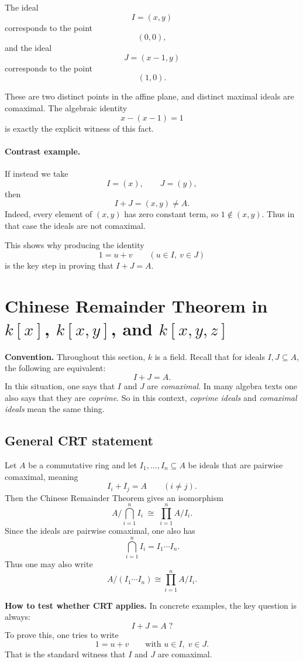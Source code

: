 \documentclass[12pt,a4paper]{article}
\theoremstyle{notespace}
\begin{document}
The ideal
\[
I=(x,y)
\]
corresponds to the point
\[
(0,0),
\]
and the ideal
\[
J=(x-1,y)
\]
corresponds to the point
\[
(1,0).
\]

These are two distinct points in the affine plane, and distinct maximal ideals are comaximal. The algebraic identity
\[
x-(x-1)=1
\]
is exactly the explicit witness of this fact.

\paragraph{Contrast example.}

If instead we take
\[
I=(x),\qquad J=(y),
\]
then
\[
I+J=(x,y)\neq A.
\]
Indeed, every element of \((x,y)\) has zero constant term, so \(1\notin (x,y)\). Thus in that case the ideals are not comaximal.

This shows why producing the identity
\[
1=u+v
\qquad (u\in I,\ v\in J)
\]
is the key step in proving that \(I+J=A\).

\section{Chinese Remainder Theorem in \(k[x]\), \(k[x,y]\), and \(k[x,y,z]\)}

\textbf{Convention.}
Throughout this section, \(k\) is a field.
Recall that for ideals \(I,J\subseteq A\), the following are equivalent:
\[
I+J=A.
\]
In this situation, one says that \(I\) and \(J\) are \emph{comaximal}.
In many algebra texts one also says that they are \emph{coprime}.
So in this context, \emph{coprime ideals} and \emph{comaximal ideals} mean the same thing.

\subsection{General CRT statement}

Let \(A\) be a commutative ring and let \(I_1,\dots,I_n\subseteq A\) be ideals that are pairwise comaximal, meaning
\[
I_i+I_j=A \qquad (i\neq j).
\]
Then the Chinese Remainder Theorem gives an isomorphism
\[
A/\bigcap_{i=1}^n I_i \;\cong\; \prod_{i=1}^n A/I_i.
\]
Since the ideals are pairwise comaximal, one also has
\[
\bigcap_{i=1}^n I_i = I_1\cdots I_n.
\]
Thus one may also write
\[
A/(I_1\cdots I_n)\cong \prod_{i=1}^n A/I_i.
\]

\medskip

\textbf{How to test whether CRT applies.}
In concrete examples, the key question is always:
\[
I+J=A\; ?
\]
To prove this, one tries to write
\[
1=u+v
\qquad \text{with } u\in I,\; v\in J.
\]
That is the standard witness that \(I\) and \(J\) are comaximal.
\end{document}
